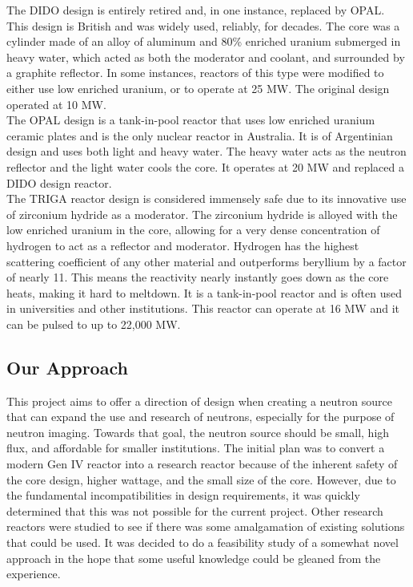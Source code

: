 The DIDO design is entirely retired and, in one instance, replaced by OPAL. This design is British and was widely used, reliably, for decades. The core was a cylinder made of an alloy of aluminum and 80\% enriched uranium submerged in heavy water, which acted as both the moderator and coolant, and surrounded by a graphite reflector. In some instances, reactors of this type were modified to either use low enriched uranium, or to operate at 25 MW. The original design operated at 10 MW.\\

The OPAL design is a tank-in-pool reactor that uses low enriched uranium ceramic plates and is the only nuclear reactor in Australia. It is of Argentinian design and uses both light and heavy water. The heavy water acts as the neutron reflector and the light water cools the core. It operates at 20 MW and replaced a DIDO design reactor.\\

The TRIGA reactor design is considered immensely safe due to its innovative use of zirconium hydride as a moderator. The zirconium hydride is alloyed with the low enriched uranium in the core, allowing for a very dense concentration of hydrogen to act as a reflector and moderator. Hydrogen has the highest scattering coefficient of any other material and outperforms beryllium by a factor of nearly 11. This means the reactivity nearly instantly goes down as the core heats, making it hard to meltdown. It is a tank-in-pool reactor and is often used in universities and other institutions. This reactor can operate at 16 MW and it can be pulsed to up to 22,000 MW.

\subsection{Our Approach}

This project aims to offer a direction of design when creating a neutron source that can expand the use and research of neutrons, especially for the purpose of neutron imaging. Towards that goal, the neutron source should be small, high flux, and affordable for smaller institutions. The initial plan was to convert a modern Gen IV reactor into a research reactor because of the inherent safety of the core design, higher wattage, and the small size of the core. However, due to the fundamental incompatibilities in design requirements, it was quickly determined that this was not possible for the current project. Other research reactors were studied to see if there was some amalgamation of existing solutions that could be used. It was decided to do a feasibility study of a somewhat novel approach in the hope that some useful knowledge could be gleaned from the experience.

